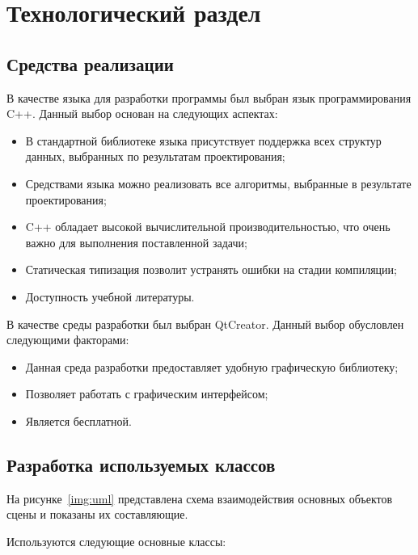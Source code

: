 \chapter{Технологический раздел}

\section{Средства реализации}

В качестве языка для разработки программы был выбран язык программирования C++. Данный выбор основан на следующих аспектах:

\begin{itemize}[label=---]
	\item В стандартной библиотеке языка присутствует поддержка всех структур данных, выбранных по результатам проектирования;
	\item Средствами языка можно реализовать все алгоритмы, выбранные в результате проектирования;
	\item C++ обладает высокой вычислительной производительностью, что очень важно для выполнения поставленной задачи;
	\item Статическая типизация позволит устранять ошибки на стадии компиляции;
	\item Доступность учебной литературы.
\end{itemize}

В качестве среды разработки был выбран QtCreator. Данный выбор обусловлен следующими факторами:

\begin{itemize}[label=---]
	\item Данная среда разработки предоставляет удобную графическую библиотеку;
	\item Позволяет работать с графическим интерфейсом;
	\item Является бесплатной.
\end{itemize}

\section{Разработка используемых классов}

На рисунке~\ref{img:uml} представлена схема взаимодействия основных объектов сцены и показаны их составляющие.

Используются следующие основные классы:

